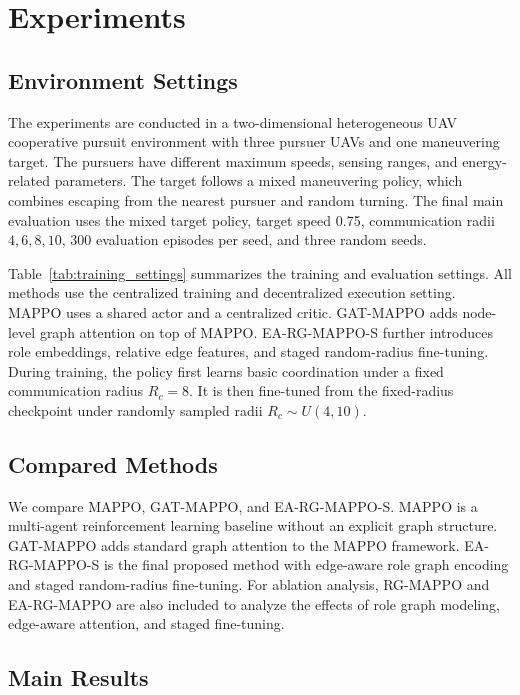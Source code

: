\section{Experiments}

\subsection{Environment Settings}

The experiments are conducted in a two-dimensional heterogeneous UAV cooperative pursuit environment with three pursuer UAVs and one maneuvering target. The pursuers have different maximum speeds, sensing ranges, and energy-related parameters. The target follows a mixed maneuvering policy, which combines escaping from the nearest pursuer and random turning. The final main evaluation uses the mixed target policy, target speed 0.75, communication radii $4,6,8,10$, 300 evaluation episodes per seed, and three random seeds.



Table~\ref{tab:training_settings} summarizes the training and evaluation settings. All methods use the centralized training and decentralized execution setting. MAPPO uses a shared actor and a centralized critic. GAT-MAPPO adds node-level graph attention on top of MAPPO. EA-RG-MAPPO-S further introduces role embeddings, relative edge features, and staged random-radius fine-tuning. During training, the policy first learns basic coordination under a fixed communication radius $R_c=8$. It is then fine-tuned from the fixed-radius checkpoint under randomly sampled radii $R_c\sim U(4,10)$.

\subsection{Compared Methods}

We compare MAPPO, GAT-MAPPO, and EA-RG-MAPPO-S. MAPPO is a multi-agent reinforcement learning baseline without an explicit graph structure. GAT-MAPPO adds standard graph attention to the MAPPO framework. EA-RG-MAPPO-S is the final proposed method with edge-aware role graph encoding and staged random-radius fine-tuning. For ablation analysis, RG-MAPPO and EA-RG-MAPPO are also included to analyze the effects of role graph modeling, edge-aware attention, and staged fine-tuning.

\subsection{Main Results}

